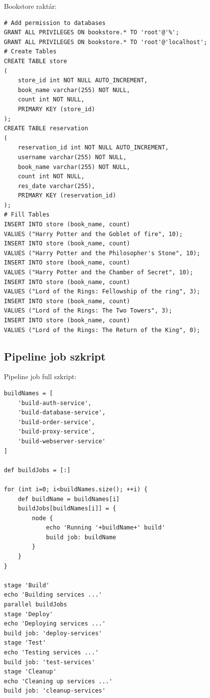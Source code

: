 \documentclass[11pt,magyar,a4paper,twoside,]{report}
\begin{document}
Bookstore raktár:

\begin{verbatim}
# Add permission to databases
GRANT ALL PRIVILEGES ON bookstore.* TO 'root'@'%';
GRANT ALL PRIVILEGES ON bookstore.* TO 'root'@'localhost';
# Create Tables
CREATE TABLE store
(
    store_id int NOT NULL AUTO_INCREMENT,
    book_name varchar(255) NOT NULL,
    count int NOT NULL,
    PRIMARY KEY (store_id)
);
CREATE TABLE reservation
(
    reservation_id int NOT NULL AUTO_INCREMENT,
    username varchar(255) NOT NULL,
    book_name varchar(255) NOT NULL,
    count int NOT NULL,
    res_date varchar(255),
    PRIMARY KEY (reservation_id)
);
# Fill Tables
INSERT INTO store (book_name, count)
VALUES ("Harry Potter and the Goblet of fire", 10);
INSERT INTO store (book_name, count)
VALUES ("Harry Potter and the Philosopher's Stone", 10);
INSERT INTO store (book_name, count)
VALUES ("Harry Potter and the Chamber of Secret", 10);
INSERT INTO store (book_name, count)
VALUES ("Lord of the Rings: Fellowship of the ring", 3);
INSERT INTO store (book_name, count)
VALUES ("Lord of the Rings: The Two Towers", 3);
INSERT INTO store (book_name, count)
VALUES ("Lord of the Rings: The Return of the King", 0);
\end{verbatim}

\subsection{\texorpdfstring{Pipeline job
szkript\label{appendix-pipline}}{Pipeline job szkript}}\label{pipeline-job-szkript}

Pipeline job full szkript:

\begin{verbatim}
buildNames = [
    'build-auth-service',
    'build-database-service',
    'build-order-service',
    'build-proxy-service',
    'build-webserver-service'
]

def buildJobs = [:]

for (int i=0; i<buildNames.size(); ++i) {
    def buildName = buildNames[i]
    buildJobs[buildNames[i]] = {
        node {
            echo 'Running '+buildName+' build'
            build job: buildName
        }
    }
}

stage 'Build'
echo 'Building services ...'
parallel buildJobs
stage 'Deploy'
echo 'Deploying services ...'
build job: 'deploy-services'
stage 'Test'
echo 'Testing services ...'
build job: 'test-services'
stage 'Cleanup'
echo 'Cleaning up services ...'
build job: 'cleanup-services'
\end{verbatim}
\end{document}
